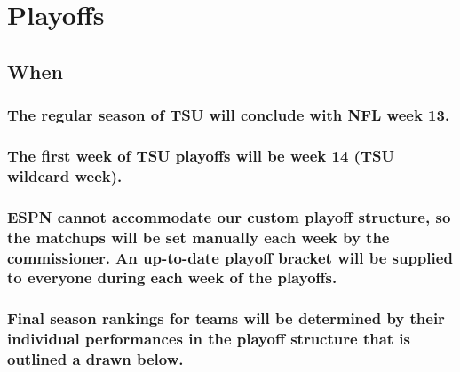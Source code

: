 \documentclass[
]{book}
\begin{document}
\hypertarget{playoffs}{%
\chapter{Playoffs}\label{playoffs}}

\hypertarget{when}{%
\section{When}\label{when}}

\hypertarget{the-regular-season-of-tsu-will-conclude-with-nfl-week-13.}{%
\subsection{The regular season of TSU will conclude with NFL week 13.}\label{the-regular-season-of-tsu-will-conclude-with-nfl-week-13.}}

\hypertarget{the-first-week-of-tsu-playoffs-will-be-week-14-tsu-wildcard-week.}{%
\subsection{The first week of TSU playoffs will be week 14 (TSU wildcard week).}\label{the-first-week-of-tsu-playoffs-will-be-week-14-tsu-wildcard-week.}}

\hypertarget{espn-cannot-accommodate-our-custom-playoff-structure-so-the-matchups-will-be-set-manually-each-week-by-the-commissioner.-an-up-to-date-playoff-bracket-will-be-supplied-to-everyone-during-each-week-of-the-playoffs.}{%
\subsection{ESPN cannot accommodate our custom playoff structure, so the matchups will be set manually each week by the commissioner. An up-to-date playoff bracket will be supplied to everyone during each week of the playoffs.}\label{espn-cannot-accommodate-our-custom-playoff-structure-so-the-matchups-will-be-set-manually-each-week-by-the-commissioner.-an-up-to-date-playoff-bracket-will-be-supplied-to-everyone-during-each-week-of-the-playoffs.}}

\hypertarget{final-season-rankings-for-teams-will-be-determined-by-their-individual-performances-in-the-playoff-structure-that-is-outlined-a-drawn-below.}{%
\subsection{Final season rankings for teams will be determined by their individual performances in the playoff structure that is outlined a drawn below.}\label{final-season-rankings-for-teams-will-be-determined-by-their-individual-performances-in-the-playoff-structure-that-is-outlined-a-drawn-below.}}
\end{document}
